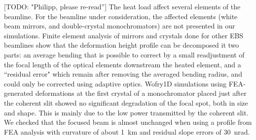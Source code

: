 \documentclass{iucr}              %
\newcommand{\todo}[1]{{\color{red}[TODO: "#1'']}}
\begin{document}
\todo{Philipp, please re-read} The heat load affect several elements of the beamline. For the beamline under consideration, the affected elements (white beam mirrors, and double-crystal monochromators) are not presented in our simulations. Finite element analysis of mirrors and crystals done for other EBS beamlines \cite{Brumund} show that the deformation height profile can be decomposed it two parts: an average bending that is possible to correct by a small readjustment of the focal length of the optical elements downstream the heated element, and a ``residual error" which remain after removing the averaged bending radius, and could only be corrected using adaptive optics. Wofry1D simulations using FEA-generated deformations at the first crystal of a monochromator placed just after the coherent slit showed no significant degradation of the focal spot, both in size and shape. This is mainly due to the low power transmitted by the coherent slit. We checked that the focused beam is almost unchanged when using a profile from FEA analysis with curvature of about \SI{1}{\kilo\meter} and residual slope errors of \SI{30}{\nano\radian}. 



\end{document}
